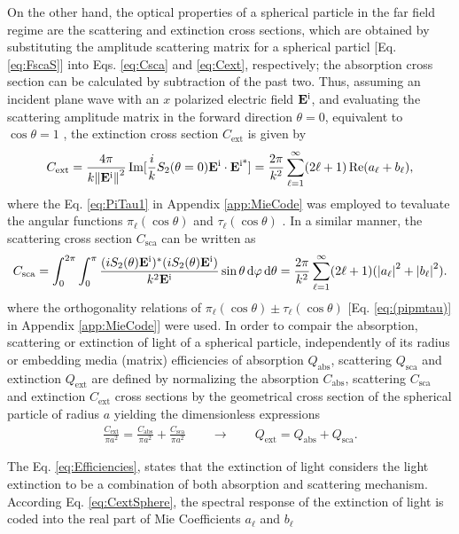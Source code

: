 On the other hand, the optical properties of  a spherical particle in the far field regime are  the scattering and extinction cross sections, which are obtained by substituting the amplitude scattering matrix for a spherical particl [Eq. \eqref{eq:FscaS}]  into Eqs. \eqref{eq:Csca} and \eqref{eq:Cext}, respectively; the absorption cross section can be calculated by subtraction of the past two. Thus, assuming an incident plane wave with an $x$ polarized electric field $\vb{E}^\text{i}$, and evaluating the scattering amplitude matrix in the forward direction $\theta = 0$, equivalent to $\cos\theta = 1$ , the extinction cross section $C_\text{ext}$ is given by
%
\begin{align}
	C_\text{ext} = \frac{4\pi}{k \norm{\vb{E}^\text{i}}^2}\Im[\frac{i}{k}S_2(\theta = 0)\vb{E}^\text{i}\cdot\vb{E}^\text{i*}]
	  			 = \frac{2 \pi}{k^2}\sum_{\ell = 1}^\infty (2 \ell + 1) \Re(a_\ell + b_\ell),
	\label{eq:CextSphere}
\end{align}
where the Eq. \eqref{eq:PiTau1} in Appendix \ref{app:MieCode} was employed to tevaluate the angular functions $\pi_\ell(\cos\theta)$ and $\tau_\ell(\cos\theta)$ . In a similar manner, the scattering cross section $C_\text{sca}$  can be written as
%
\begin{align}
C_\text{sca} = \int_0^{2\pi}\int_0^\pi  \frac{(iS_2(\theta)\vb{E}^\text{i})^*(iS_2(\theta)\vb{E}^\text{i})}{k^2\vb{E}^\text{i}} \sin\theta\dd{\varphi}\dd{\theta}
			 = \frac{2 \pi}{k^2}\sum_{\ell = 1}^\infty (2 \ell + 1) (\abs{a_\ell}^2 + \abs{b_\ell}^2).
	\label{eq:CscaSphere}
\end{align}
%
where the orthogonality relations of $\pi_\ell(\cos\theta)\pm\tau_\ell(\cos\theta)$ [Eq. \eqref{eq:(pipmtau)} in Appendix \ref{app:MieCode}] were used. In order to compair the absorption, scattering or extinction of light of a spherical particle, independently of its radius or embedding media (matrix) efficiencies of  absorption $Q_\text{abs}$, scattering $Q_\text{sca}$ and extinction $Q_\text{ext}$ are defined by normalizing the   absorption $C_\text{abs}$, scattering $C_\text{sca}$ and extinction $C_\text{ext}$ cross sections by the geometrical cross section of the spherical particle of radius $a$ yielding the dimensionless expressions
%
\begin{align}
 	\frac{C_\text{ext}}{\pi a^2} =   \frac{C_\text{abs}}{\pi a^2}  + \frac{C_\text{sca}}{\pi a^2}
 		\qquad \longrightarrow \qquad
	Q_\text{ext} =    Q_\text{abs}  +  Q_\text{sca}.
	\label{eq:Efficiencies}
\end{align}
%

The Eq. \eqref{eq:Efficiencies}, states that the extinction of light considers  the light extinction to be a combination of both absorption and scattering mechanism. According Eq. \eqref{eq:CextSphere}, the spectral response of the extinction of light is coded into the real part of Mie Coefficients $a_\ell$ and $b_\ell$ {}
